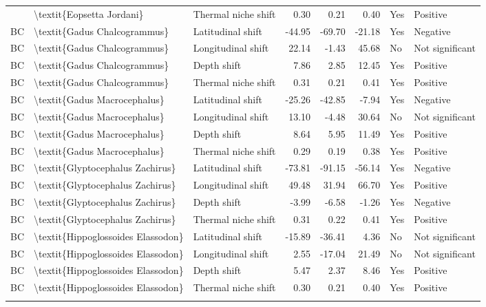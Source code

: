 \begin{longtable}[t]{lllrrrll}
{{BC & \textbackslash{}textit\{Eopsetta Jordani\} & Thermal niche shift & 0.30 & 0.21 & 0.40 & Yes & Positive\\
BC & \textbackslash{}textit\{Gadus Chalcogrammus\} & Latitudinal shift & -44.95 & -69.70 & -21.18 & Yes & Negative\\
BC & \textbackslash{}textit\{Gadus Chalcogrammus\} & Longitudinal shift & 22.14 & -1.43 & 45.68 & No & Not significant\\
BC & \textbackslash{}textit\{Gadus Chalcogrammus\} & Depth shift & 7.86 & 2.85 & 12.45 & Yes & Positive\\
\addlinespace
BC & \textbackslash{}textit\{Gadus Chalcogrammus\} & Thermal niche shift & 0.31 & 0.21 & 0.41 & Yes & Positive\\
BC & \textbackslash{}textit\{Gadus Macrocephalus\} & Latitudinal shift & -25.26 & -42.85 & -7.94 & Yes & Negative\\
BC & \textbackslash{}textit\{Gadus Macrocephalus\} & Longitudinal shift & 13.10 & -4.48 & 30.64 & No & Not significant\\
BC & \textbackslash{}textit\{Gadus Macrocephalus\} & Depth shift & 8.64 & 5.95 & 11.49 & Yes & Positive\\
BC & \textbackslash{}textit\{Gadus Macrocephalus\} & Thermal niche shift & 0.29 & 0.19 & 0.38 & Yes & Positive\\
\addlinespace
BC & \textbackslash{}textit\{Glyptocephalus Zachirus\} & Latitudinal shift & -73.81 & -91.15 & -56.14 & Yes & Negative\\
BC & \textbackslash{}textit\{Glyptocephalus Zachirus\} & Longitudinal shift & 49.48 & 31.94 & 66.70 & Yes & Positive\\
BC & \textbackslash{}textit\{Glyptocephalus Zachirus\} & Depth shift & -3.99 & -6.58 & -1.26 & Yes & Negative\\
BC & \textbackslash{}textit\{Glyptocephalus Zachirus\} & Thermal niche shift & 0.31 & 0.22 & 0.41 & Yes & Positive\\
BC & \textbackslash{}textit\{Hippoglossoides Elassodon\} & Latitudinal shift & -15.89 & -36.41 & 4.36 & No & Not significant\\
\addlinespace
BC & \textbackslash{}textit\{Hippoglossoides Elassodon\} & Longitudinal shift & 2.55 & -17.04 & 21.49 & No & Not significant\\
BC & \textbackslash{}textit\{Hippoglossoides Elassodon\} & Depth shift & 5.47 & 2.37 & 8.46 & Yes & Positive\\
BC & \textbackslash{}textit\{Hippoglossoides Elassodon\} & Thermal niche shift & 0.30 & 0.21 & 0.40 & Yes & Positive\\
}}
\end{longtable}
